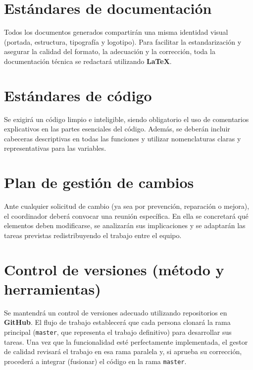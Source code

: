 \documentclass[11pt,a4paper]{article}
\newcommand{\key}[1]{\textbf{\color{brandblue}#1}}
\begin{document}
\section{Estándares de documentación}
Todos los documentos generados compartirán una misma identidad visual (portada, estructura, tipografía y logotipo). Para facilitar la estandarización y asegurar la calidad del formato, la adecuación y la corrección, toda la documentación técnica se redactará utilizando \key{LaTeX}.

\section{Estándares de código}
Se exigirá un código limpio e inteligible, siendo obligatorio el uso de comentarios explicativos en las partes esenciales del código. Además, se deberán incluir cabeceras descriptivas en todas las funciones y utilizar nomenclaturas claras y representativas para las variables.

\section{Plan de gestión de cambios}
Ante cualquier solicitud de cambio (ya sea por prevención, reparación o mejora), el coordinador deberá convocar una reunión específica. En ella se concretará qué elementos deben modificarse, se analizarán sus implicaciones y se adaptarán las tareas previstas redistribuyendo el trabajo entre el equipo.

\begin{center}
\end{center}

\section{Control de versiones (método y herramientas)}
Se mantendrá un control de versiones adecuado utilizando repositorios en \key{GitHub}. El flujo de trabajo establecerá que cada persona clonará la rama principal (\texttt{master}, que representa el trabajo definitivo) para desarrollar sus tareas. Una vez que la funcionalidad esté perfectamente implementada, el gestor de calidad revisará el trabajo en esa rama paralela y, si aprueba su corrección, procederá a integrar (fusionar) el código en la rama \texttt{master}.
\end{document}
